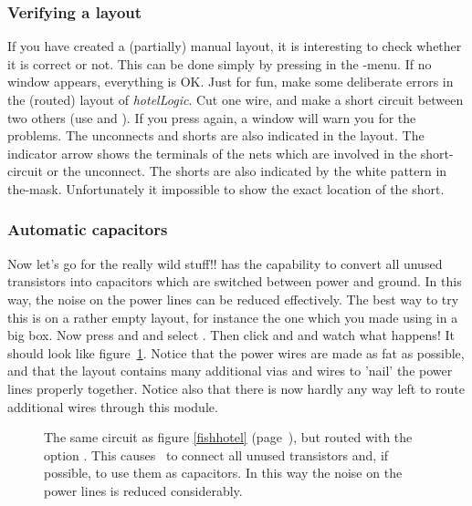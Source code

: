 \subsubsection{Verifying a layout}
If you have created a (partially) manual layout, it is interesting to check
whether it is correct or not. This can be done simply by pressing  in the -menu. If no window appears, everything is OK. Just
for fun, make some deliberate errors in the (routed) layout of {\sl
hotelLogic}. Cut one wire, and make a short circuit between two others (use
 and
). If you press  again, a window will warn
you for the problems. The unconnects and shorts are also indicated in the
layout. The indicator arrow shows the terminals of the nets which are involved
in the short-circuit or the unconnect. The shorts are also indicated by the
white pattern in the-mask. Unfortunately it impossible to show
the exact location of the short.

\subsubsection{Automatic capacitors}
Now let's go for the really wild stuff!!  has the capability
to convert all unused transistors into capacitors which are switched between
power and ground. In this way, the noise on the power lines can be reduced
effectively. The best way to try this is on a rather empty layout, for
instance the one which you made using  in a big box. Now press
 and  and select . Then
click  and  and watch what happens!
It should look like figure~\ref{capas}. Notice that the power wires are made as
fat as possible, and that the layout contains many additional vias and wires to
'nail' the power lines properly together.  Notice also that there is now hardly
any way left to route additional wires through this module.

\begin{figure}
\centerline{}
\caption{The same circuit as figure \protect\ref{fishhotel}
(page~\protect\pageref{fishhotel}), but routed with the option
\protect{}. This causes~\protect{} to connect all
unused transistors and, if possible, to use them as capacitors. In this
way the noise on the power lines is reduced considerably.}
\label{capas}
\end{figure}

